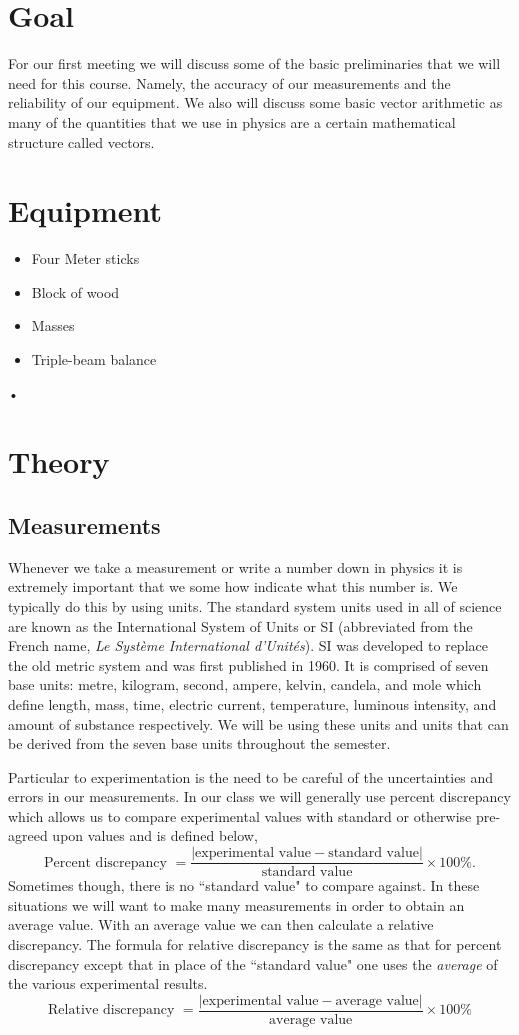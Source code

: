 \documentclass[main.tex]{subfiles}
\begin{document}
\section*{Goal}
For our first meeting we will discuss some of the basic preliminaries that we will need for this course. Namely, the accuracy of our measurements and the reliability of our equipment. We also will discuss some basic vector arithmetic as many of the quantities that we use in physics are a certain mathematical structure called vectors.

\section*{Equipment}
\begin{itemize}
\item
Four Meter sticks
\item
Block of wood
\item
Masses
\item
Triple-beam balance
\end{itemize}•

\section*{Theory}
\subsection*{Measurements}
Whenever we take a measurement or write a number down in physics it is extremely important that we some how indicate what this number is. We typically do this by using units. The standard system units used in all of science are known as the International System of Units or SI (abbreviated from the French name, \emph{Le Syst\`{e}me International d'Unit\'{e}s}). SI was developed to replace the old metric system and was first published in 1960. It is comprised of seven base units: metre, kilogram, second, ampere, kelvin, candela, and mole which define length, mass, time, electric current, temperature, luminous intensity, and amount of substance respectively. We will be using these units and units that can be derived from the seven base units throughout the semester.

Particular to experimentation is the need to be careful of the uncertainties and errors in our measurements. In our class we will generally use percent discrepancy which allows us to compare experimental values with standard or otherwise pre-agreed upon values and is defined below,
\[
\text{Percent discrepancy } = \frac{|\text{experimental value} - \text{standard value}|}{\text{standard value}}\times 100\%.
\]
Sometimes though, there is no ``standard value" to compare against. In these situations we will want to make many measurements in order to obtain an average value. With an average value we can then calculate a relative discrepancy. The formula for relative discrepancy is the same as that for percent discrepancy except that in place of the ``standard value" one uses the \emph{average} of the various experimental results.
\[ 
\text{Relative discrepancy } = \frac{|\text{experimental value} - \text{average value}|}{\text{average value}} \times 100\%
\]
\end{document}
